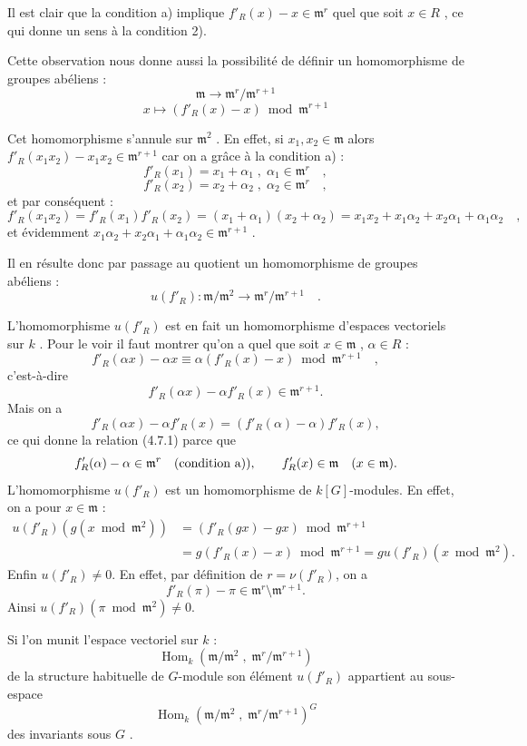 \documentclass[11pt]{article}
\providecommand{\fm}{\mathfrak{m}}
\DeclareMathOperator{\Hom}{Hom}
\providecommand{\Hom}{\operatorname{Hom}}
\providecommand{\fm}{\mathfrak m}
\providecommand{\Hom}{\operatorname{Hom}}
\begin{document}
Il est clair que la condition a) implique $f'_R(x) - x \in \fm^r$ quel que soit $x \in R$ , ce qui donne un sens à la condition 2).

Cette observation nous donne aussi la possibilité de définir un homomorphisme de groupes abéliens :
\[
\fm \longrightarrow \fm^r/\fm^{r+1}
\]
\[
x \longmapsto (f'_R(x) - x) \bmod \fm^{r+1}
\]

Cet homomorphisme s'annule sur $\fm^2$ . En effet, si $x_1, x_2 \in \fm$ alors $f'_R(x_1x_2) - x_1x_2 \in \fm^{r+1}$ car on a grâce à la condition a) :
\[
f'_R(x_1) = x_1 + \alpha_1 \; , \; \alpha_1 \in \fm^r \quad ,
\]
\[
f'_R(x_2) = x_2 + \alpha_2 \; , \; \alpha_2 \in \fm^r \quad ,
\]
et par conséquent :
\[
f'_R(x_1x_2) = f'_R(x_1)f'_R(x_2) = (x_1 + \alpha_1)(x_2 + \alpha_2) = x_1x_2 + x_1\alpha_2 + x_2\alpha_1 + \alpha_1\alpha_2 \quad ,
\]
et évidemment $x_1\alpha_2 + x_2\alpha_1 + \alpha_1\alpha_2 \in \fm^{r+1}$ .

Il en résulte donc par passage au quotient un homomorphisme de groupes abéliens :
\[
u(f'_R) : \fm/\fm^2 \longrightarrow \fm^r/\fm^{r+1} \quad .
\]

L'homomorphisme $u(f'_R)$ est en fait un homomorphisme d'espaces vectoriels sur $k$ . Pour le voir il faut montrer qu'on a quel que soit $x \in \fm$ , $\alpha \in R$ :
\[
f'_R(\alpha x) - \alpha x \equiv \alpha(f'_R(x) - x) \bmod \fm^{r+1} \quad ,
\]
c'est-à-dire
\begin{equation}
\tag{4.7.1}
f'_R(\alpha x)-\alpha f'_R(x)\in\fm^{r+1}.
\end{equation}
Mais on a
\[
f'_R(\alpha x)-\alpha f'_R(x)=(f'_R(\alpha)-\alpha)f'_R(x),
\]
ce qui donne la relation (4.7.1) parce que
\[
f'_R(\alpha)-\alpha\in\fm^r\quad\hbox{(condition a))},
\qquad
f'_R(x)\in\fm\quad (x\in\fm).
\]
L'homomorphisme $u(f'_R)$ est un homomorphisme de $k[G]$-modules. En effet, on a pour $x\in\fm$ :
\[
\begin{aligned}
u(f'_R)(g(x\bmod\fm^2))
&=(f'_R(gx)-gx)\bmod\fm^{r+1}\\
&=g(f'_R(x)-x)\bmod\fm^{r+1}
=gu(f'_R)(x\bmod\fm^2).
\end{aligned}
\]
Enfin $u(f'_R)\ne0$. En effet, par définition de $r=\nu(f'_R)$, on a
\[
f'_R(\pi)-\pi\in\fm^r\setminus\fm^{r+1}.
\]
Ainsi $u(f'_R)(\pi\bmod\fm^2)\ne0$.

Si l'on munit l'espace vectoriel sur $k$ :
\[
\Hom_k(\fm/\fm^2 \; , \; \fm^r/\fm^{r+1})
\]
de la structure habituelle de $G$-module son élément $u(f'_R)$ appartient au sous-espace
\[
\Hom_k(\fm/\fm^2 \; , \; \fm^r/\fm^{r+1})^G
\]
des invariants sous $G$ .
\end{document}
